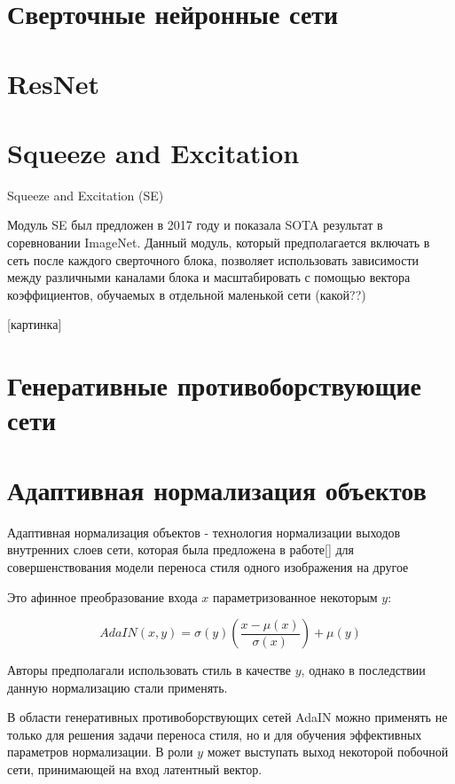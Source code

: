 \section{Сверточные нейронные сети}

\section{ResNet}

\section{Squeeze and Excitation}

Squeeze and Excitation (SE)

Модуль SE был предложен в 2017 году и показала SOTA результат в соревновании ImageNet. Данный модуль, который предполагается включать в сеть после каждого сверточного блока, позволяет использовать зависимости между различными каналами блока и масштабировать с помощью вектора коэффициентов, обучаемых в отдельной маленькой сети (какой??) 

[картинка]


\section{Генеративные противоборствующие сети}


\section{Адаптивная нормализация объектов}

Адаптивная нормализация объектов - технология нормализации выходов внутренних слоев сети, которая была предложена в работе[] для совершенствования модели переноса стиля одного изображения на другое

Это афинное преобразование входа $x$ параметризованное некоторым $y$:

$$AdaIN(x, y) = \sigma(y)(\dfrac{x - \mu(x)}{\sigma(x)}) + \mu(y)$$

Авторы предполагали использовать стиль в качестве $y$, однако в последствии данную нормализацию стали применять.

В области генеративных противоборствующих сетей AdaIN можно применять не только для решения задачи переноса стиля, но и для обучения эффективных параметров нормализации. В роли $y$ может выступать выход некоторой побочной сети, принимающей на вход латентный вектор.